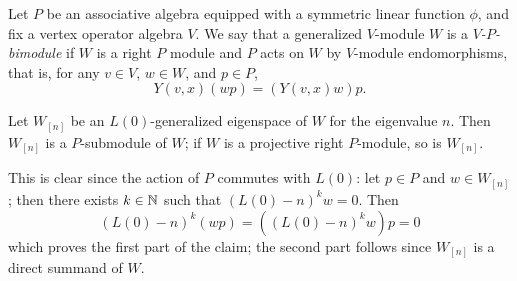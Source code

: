 \documentclass[12pt]{article}
\begin{document}
Let $P$ be an associative algebra equipped with a symmetric linear function
$\phi$, and fix a vertex operator algebra $V$.
We say that a generalized $V$-module $W$ is a \emph{$V$-$P$-bimodule} if $W$
is a right $P$ module and $P$ acts on $W$ by $V$-module endomorphisms, that
is, for any $v\in V$, $w\in W$, and $p \in P$,
$$
  Y(v,x)(wp) = (Y(v,x)w)p.
$$
\begin{prop} \label{Wn-P-submodule}
  Let $W_{[n]}$ be an $L(0)$-generalized eigenspace of $W$ for the eigenvalue
  $n$. Then $W_{[n]}$ is a $P$-submodule of $W$; if $W$ is a projective right
  $P$-module, so is $W_{[n]}$.
\end{prop}
\proof
  This is clear since the action of $P$ commutes with $L(0)$:
  let $p\in P$ and $w\in W_{[n]}$; then there exists $k\in \mathbb{N}$ such that
  $(L(0) - n)^kw = 0$. Then
  $$
  (L(0)-n)^k(wp) = ((L(0)-n)^kw)p = 0
  $$
  which proves the first part of the claim; the second part follows since
  $W_{[n]}$ is a direct summand of $W$.
\epfv
\end{document}
